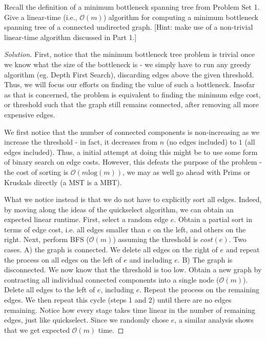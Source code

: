 \documentclass[10pt]{article}
\newenvironment{problem}[2][Problem]{\begin{trivlist}
\item[\hskip \labelsep {\bfseries #1}\hskip \labelsep {\bfseries #2.}]}{\end{trivlist}}
\begin{document}
\begin{problem}{4}
Recall the definition of a minimum bottleneck spanning tree from Problem Set 1. Give a linear-time (i.e., $\mathcal{O}(m)$) algorithm for computing a minimum bottleneck spanning tree of a connected undirected graph. [Hint: make use of a non-trivial linear-time algorithm discussed in Part 1.]
\end{problem}
\begin{proof}[Solution]
First, notice that the minimum bottleneck tree problem is trivial once we know what the size of the bottleneck is - we simply have to run any greedy algorithm (eg. Depth First Search), discarding edges above the given threshold. Thus, we will focus our efforts on finding the value of such a bottleneck. Insofar as that is concerned, the problem is equivalent to finding the minimum edge cost, or threshold such that the graph still remains connected, after removing all more expensive edges.

We first notice that the number of connected components is non-increasing as we increase the threshold - in fact, it decreases from $n$ (no edges included) to $1$ (all edges included). Thus, a initial attempt at doing this might be to use some form of binary search on edge costs. However, this defeats the purpose of the problem - the cost of sorting is $\mathcal{O}(m\textrm{log}(m))$, we may as well go ahead with Prims or Kruskals directly (a MST is a MBT).

What we notice instead is that we do not have to explicitly sort all edges. Indeed, by moving along the ideas of the quickselect algorithm, we can obtain an expected linear runtime. First, select a random edge $e$. Obtain a partial sort in terms of edge cost, i.e. all edges smaller than $e$ on the left, and others on the right. Next, perform BFS ($\mathcal{O}(m)$) assuming the threshold is $cost(e)$. Two cases. A) the graph is connected. We delete all edges on the right of $e$ and repeat the process on all edges on the left of $e$ and including $e$. B) The graph is disconnected. We now know that the threshold is too low. Obtain a new graph by contracting all individual connected components into a single node ($\mathcal{O}(m)$). Delete all edges to the left of $e$, including $e$. Repeat the process on the remaining edges. We then repeat this cycle (steps 1 and 2) until there are no edges remaining. Notice how every stage takes time linear in the number of remaining edges, just like quickselect. Since we randomly chose $e$, a similar analysis shows that we get expected $\mathcal{O}(m)$ time.

\end{proof}
\end{document}
